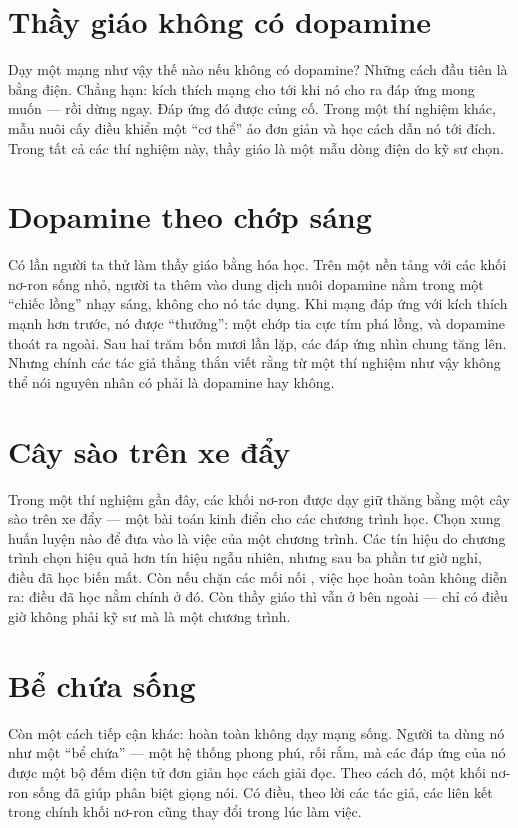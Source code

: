 \section*{Thầy giáo không có dopamine}

Dạy một mạng như vậy thế nào nếu không có dopamine? Những cách đầu tiên là bằng điện. Chẳng hạn: kích thích mạng cho tới khi nó cho ra đáp ứng mong muốn --- rồi dừng ngay. Đáp ứng đó được củng cố. Trong một thí nghiệm khác, mẫu nuôi cấy điều khiển một ``cơ thể'' ảo đơn giản và học cách dẫn nó tới đích. Trong tất cả các thí nghiệm này, thầy giáo là một mẫu dòng điện do kỹ sư chọn.

\section*{Dopamine theo chớp sáng}

Có lần người ta thử làm thầy giáo bằng hóa học. Trên một nền tảng với các khối nơ-ron sống nhỏ, người ta thêm vào dung dịch nuôi dopamine nằm trong một ``chiếc lồng'' nhạy sáng, không cho nó tác dụng. Khi mạng đáp ứng với kích thích mạnh hơn trước, nó được ``thưởng'': một chớp tia cực tím phá lồng, và dopamine thoát ra ngoài. Sau hai trăm bốn mươi lần lặp, các đáp ứng nhìn chung tăng lên. Nhưng chính các tác giả thẳng thắn viết rằng từ một thí nghiệm như vậy không thể nói nguyên nhân có phải là dopamine hay không.

\section*{Cây sào trên xe đẩy}

Trong một thí nghiệm gần đây, các khối nơ-ron được dạy giữ thăng bằng một cây sào trên xe đẩy --- một bài toán kinh điển cho các chương trình học. Chọn xung huấn luyện nào để đưa vào là việc của một chương trình. Các tín hiệu do chương trình chọn hiệu quả hơn tín hiệu ngẫu nhiên, nhưng sau ba phần tư giờ nghỉ, điều đã học biến mất. Còn nếu chặn các mối nối , việc học hoàn toàn không diễn ra: điều đã học nằm chính ở đó. Còn thầy giáo thì vẫn ở bên ngoài --- chỉ có điều giờ không phải kỹ sư mà là một chương trình.

\section*{Bể chứa sống}

Còn một cách tiếp cận khác: hoàn toàn không dạy mạng sống. Người ta dùng nó như một ``bể chứa'' --- một hệ thống phong phú, rối rắm, mà các đáp ứng của nó được một bộ đếm điện tử đơn giản học cách giải đọc. Theo cách đó, một khối nơ-ron sống đã giúp phân biệt giọng nói. Có điều, theo lời các tác giả, các liên kết trong chính khối nơ-ron cũng thay đổi trong lúc làm việc.

